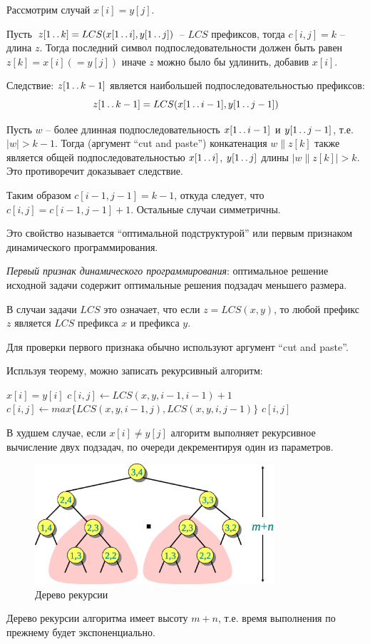 \documentclass[11pt]{article}
\begin{document}
Рассмотрим случай $x[i] = y[j]$.

Пусть $z[1 \mathinner{\ldotp\ldotp} k] = LCS(x[1 \mathinner{\ldotp\ldotp} i], y[1 \mathinner{\ldotp\ldotp} j])$ -- $LCS$ префиксов, тогда $c[i, j] = k$ -- длина $z$. Тогда последний символ подпоследовательности должен быть равен $z[k] = x[i] (= y[j])$ иначе $z$ можно было бы удлинить, добавив $x[i]$.

Следствие: $z[1 \mathinner{\ldotp\ldotp} k-1]$ является наибольшей подпоследовательностью префиксов: 
\begin{equation*}
  z[1 \mathinner{\ldotp\ldotp} k-1] = LCS(x[1 \mathinner{\ldotp\ldotp} i-1], y[1 \mathinner{\ldotp\ldotp} j-1])  
\end{equation*}

Пусть $w$ -- более длинная подпоследовательность $x[1 \mathinner{\ldotp\ldotp} i-1]$ и $y[1 \mathinner{\ldotp\ldotp} j-1]$, т.е. $|w| > k-1$. Тогда (аргумент ``cut and paste'') конкатенация $w \parallel z[k]$ также является общей подпоследовательностью $x[1 \mathinner{\ldotp\ldotp} i]$, $y[1 \mathinner{\ldotp\ldotp} j]$ длины $|w \parallel z[k]| > k$. Это противоречит доказывает следствие.

Таким образом $c[i-1, j-1] = k-1$, откуда следует, что $c[i, j] = c[i-1, j-1] +1$. Остальные случаи симметричны.

Это свойство называется ``оптимальной подструктурой'' или первым признаком динамического программирования.

\emph{Первый признак динамического программирования}: оптимальное решение исходной задачи содержит оптимальные решения подзадач меньшего размера.

В случаи задачи $LCS$ это означает, что если $z = LCS(x, y)$, то любой префикс $z$ является $LCS$ префикса $x$ и префикса $y$.

Для проверки первого признака обычно используют аргумент ``cut and paste''.

Испльзуя теорему, можно записать рекурсивный алгоритм:
\begin{codebox}
\li \If $x[i] = y[i]$
\li   \Then $c[i,j] \gets LCS(x, y, i-1, i-1)+1$
\li   \Else $c[i,j] \gets max\{LCS(x, y, i-1, j), LCS(x, y, i, j-1)\}$
    \End
\li \Return $c[i,j]$
\end{codebox}
В худшем случае, если $x[i] \neq y[j]$ алгоритм выполняет рекурсивное вычисление двух подзадач, по очереди декрементируя один из параметров.
\begin{figure}[h!]
  \centering
  \includegraphics[width=3.5in]{lecture15/tree.eps}
  \caption{Дерево рекурсии}
\end{figure}
Дерево рекурсии алгоритма имеет высоту $m+n$, т.е. время выполнения по прежнему будет экспоненциально.
\end{document}
